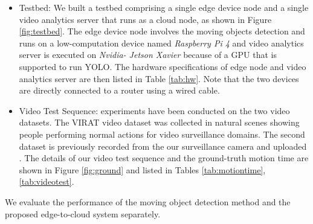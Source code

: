 \begin{itemize}
\item Testbed: We built a testbed comprising a single edge device node and a single video analytics server that runs as a cloud node, as shown in Figure \ref{fig:testbed}. The edge device node involves the moving objects detection and runs on a low-computation device named \textit{Raspberry Pi 4} and video analytics server is executed on \textit{Nvidia- Jetson Xavier} because of a GPU that is supported to run YOLO. The hardware specifications of edge node and video analytics server are then listed in Table \ref{tab:hw}. Note that the two devices are directly connected to a router using a wired cable.
\item Video Test Sequence: experiments have been conducted on the two video datasets. The VIRAT video dataset \cite{VIRAT} was collected in natural scenes showing people performing normal actions for video surveillance domains. The second dataset is previously recorded from the our surveillance camera and uploaded \cite{testvideo}. The details of our video test sequence and the ground-truth motion time are shown in Figure \ref{fig:ground} and listed in Tables \ref{tab:motiontime},\ref{tab:videotest}. 
\end{itemize}
We evaluate the performance of the moving object detection method and the proposed edge-to-cloud system separately.

